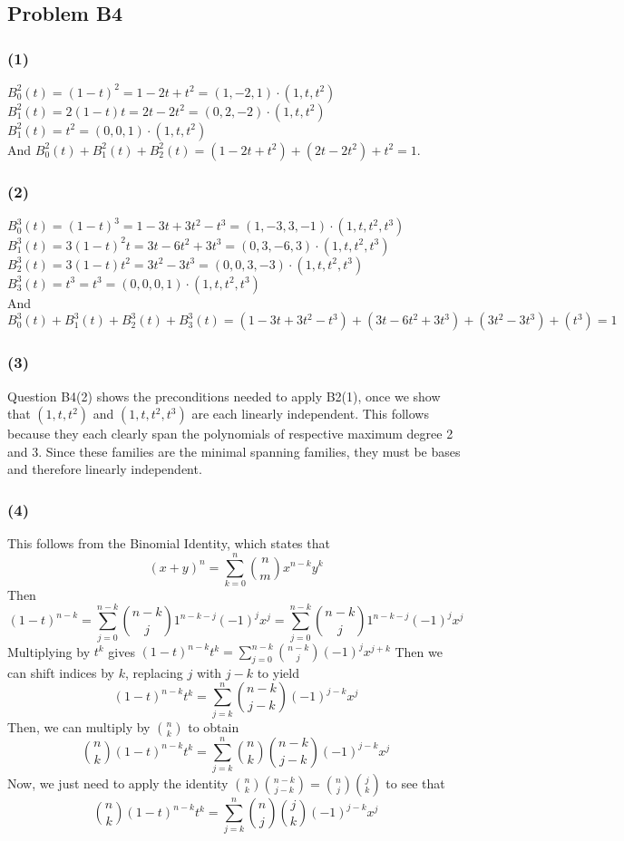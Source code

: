 \documentclass{article}
\begin{document}
\subsection{Problem B4}
\subsubsection{(1)}
$B^2_0(t) = (1-t)^2 = 1 - 2t + t^2 = (1,-2,1)\cdot(1, t, t^2)$\\
$B^2_1(t) = 2(1-t)t = 2t - 2t^2 = (0,2,-2)\cdot(1, t, t^2)$\\
$B^2_1(t) = t^2 = (0,0,1) \cdot(1,t,t^2)$\\
And $B^2_0(t) + B^2_1(t) + B^2_2(t) = (1 - 2t + t^2) + (2t - 2t^2) + t^2 = 1.$

\subsubsection{(2)}
$B^3_0(t) = (1-t)^3 = 1 - 3t + 3t^2 - t^3 = (1,-3,3,-1)\cdot(1, t, t^2,t^3)$\\
$B^3_1(t) = 3(1-t)^2t = 3t - 6t^2 + 3t^3 = (0,3,-6,3)\cdot(1, t, t^2,t^3)$\\
$B^3_2(t) = 3(1-t)t^2 = 3t^2 -3t^3 = (0,0,3,-3)\cdot(1, t, t^2,t^3)$\\
$B^3_3(t) = t^3 = t^3 = (0,0,0,1)\cdot(1, t, t^2,t^3)$\\
And $B^3_0(t) + B^3_1(t) + B^3_2(t) + B^3_3(t) = (1 - 3t + 3t^2 - t^3) + (3t -
6t^2 + 3t^3) + (3t^2 -3t^3) + (t^3) = 1$

\subsubsection{(3)}
Question B4(2) shows the preconditions needed to apply B2(1), once we show that
$(1,t,t^2)$ and $(1,t,t^2,t^3)$ are each linearly independent. This follows
because they each clearly span the polynomials of respective maximum degree 2
and 3. Since these families are the minimal spanning families, they must be
bases and therefore linearly independent.

\subsubsection{(4)}
This follows from the Binomial Identity, which states that
\[(x + y)^n = \sum_{k=0}^n \binom{n}{m}x^{n-k}y^k\]
Then 
\[(1-t)^{n-k} = \sum_{j=0}^{n-k}\binom{n-k}{j}1^{n-k-j}(-1)^jx^j =
\sum_{j=0}^{n-k}\binom{n-k}{j}1^{n-k-j}(-1)^jx^j \]
Multiplying by $t^k$ gives
$(1-t)^{n-k}t^k = \displaystyle{\sum_{j=0}^{n-k}
\binom{n-k}{j}(-1)^jx^{j+k}}$
Then we can shift indices by $k$, replacing $j$ with $j-k$ to yield
\[(1-t)^{n-k}t^k = \sum_{j=k}^{n} \binom{n-k}{j-k}(-1)^{j-k}x^j\]
Then, we can multiply by $\binom{n}{k}$ to obtain
\[\binom{n}{k}(1-t)^{n-k}t^k = \sum_{j=k}^{n} \binom{n}{k}\binom{n-k}{j-k}(-1)^{j-k}x^j\]
Now, we just need to apply the identity $\binom{n}{k}\binom{n-k}{j-k} =
\binom{n}{j}\binom{j}{k}$ to see that 
\[\binom{n}{k}(1-t)^{n-k}t^k = \sum_{j=k}^{n} \binom{n}{j}\binom{j}{k}(-1)^{j-k}x^j\]
\end{document}
